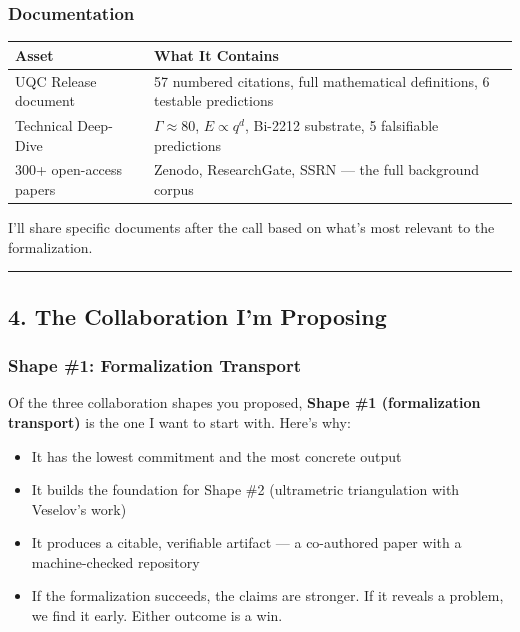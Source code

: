 \documentclass[11pt,a4paper]{article}
\begin{document}
\subsubsection*{Documentation}

\begin{center}
\begin{longtable}{|l|l|}
\hline
\textbf{Asset} & \textbf{What It Contains} \\ \hline
\endhead
UQC Release document & 57 numbered citations, full mathematical definitions, 6 testable predictions \\ \hline
Technical Deep-Dive & $\Gamma \approx 80$, $E \propto q^d$, Bi-2212 substrate, 5 falsifiable predictions \\ \hline
300+ open-access papers & Zenodo, ResearchGate, SSRN — the full background corpus \\ \hline
\end{longtable}
\end{center}

I'll share specific documents after the call based on what's most relevant to the formalization.

\bigskip
\noindent\rule{\textwidth}{0.4pt}
\bigskip
\subsection*{4. The Collaboration I'm Proposing}

\subsubsection*{Shape \#1: Formalization Transport}

Of the three collaboration shapes you proposed, \textbf{Shape \#1 (formalization transport)} is the one I want to start with. Here's why:

\begin{itemize}[nosep]
\item It has the lowest commitment and the most concrete output
\item It builds the foundation for Shape \#2 (ultrametric triangulation with Veselov's work)
\item It produces a citable, verifiable artifact — a co-authored paper with a machine-checked repository
\item If the formalization succeeds, the claims are stronger. If it reveals a problem, we find it early. Either outcome is a win.
\end{itemize}
\end{document}
